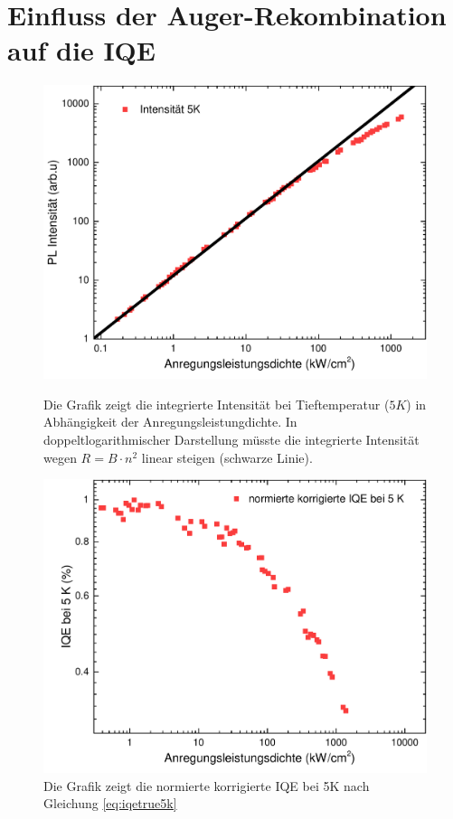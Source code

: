 
\chapter{Einfluss der Auger-Rekombination auf die IQE}
\label{chap:auger}
\thispagestyle{fancy}
%
\begin{figure}[ht]
    \centering
    \begin{minipage}[t]{0.49\linewidth}
        \centering
        \includegraphics[width=\linewidth]{Bilder/AugerBei5K.pdf}
        \caption{Die Grafik zeigt die integrierte Intensität bei Tieftemperatur ($5 K$) in Abhängigkeit der Anregungsleistungdichte. In doppeltlogarithmischer Darstellung müsste die integrierte Intensität wegen $R = B \cdot n^2$ linear steigen (schwarze Linie).}
        \label{fig:auger5k}
    \end{minipage}%
    \hfill
    \begin{minipage}[t]{0.49\linewidth}
        \centering
        \includegraphics[width=\linewidth]{Bilder/NormierteKorrgierteIQE5K.pdf}
        \caption{Die Grafik zeigt die normierte korrigierte IQE bei 5K nach Gleichung \ref{eq:iqetrue5k}}
        \label{fig:trueiqe}
    \end{minipage}
\end{figure}
